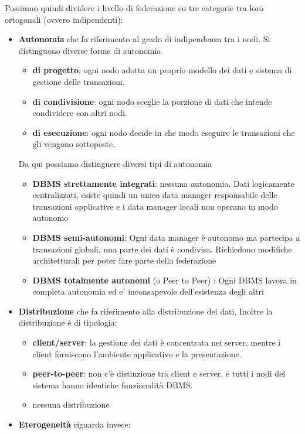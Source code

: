 Possiamo quindi dividere i livello di federazione su tre categorie tra loro ortogonali (ovvero indipendenti): 
\begin{itemize}
    \item \textbf{Autonomia} che fa riferimento al grado di indipendenza tra i nodi. Si distinguono diverse forme di autonomia
    \begin{itemize}
        \item \textbf{di progetto}: ogni nodo adotta un proprio modello dei dati e sistema di gestione delle transazioni.
        \item \textbf{di condivisione}: ogni nodo sceglie la porzione di dati che intende condividere con altri nodi.
        \item \textbf{di esecuzione}: ogni nodo decide in che modo eseguire le transazioni che gli vengono sottoposte.
    \end{itemize}
    Da qui possiamo distinguere diversi tipi di autonomia
    \begin{itemize}
        \item \textbf{DBMS strettamente integrati}: nessuna autonomia. Dati logicamente centralizzati, esiste quindi un unico data manager responsabile delle transazioni applicative e i data manager locali non operano in modo autonomo
        \item \textbf{DBMS semi-autonomi}: Ogni data manager è autonomo ma partecipa a transazioni globali, una parte dei dati è condivisa. Richiedono modifiche architetturali per poter fare parte della federazione 
        \item \textbf{DBMS totalmente autonomi} (o Peer to Peer) : Ogni DBMS lavora in completa autonomia ed e’ inconsapevole dell’esistenza degli altri
    \end{itemize} 
    \item \textbf{Distribuzione} che fa riferimento alla distribuzione dei dati. Inoltre la distribuzione è di tipologia:
    \begin{itemize}
        \item \textbf{client/server}: la gestione dei dati è concentrata nei server, mentre i client forniscono l’ambiente applicativo e la presentazione. 
        \item\textbf{ peer-to-peer}: non c'è distinzione tra client e server, e tutti i nodi del sistema hanno identiche funzionalità DBMS.
        \item nessuna distribuzione
    \end{itemize}
    \item \textbf{Eterogeneità} riguarda invece:

\end{itemize}
